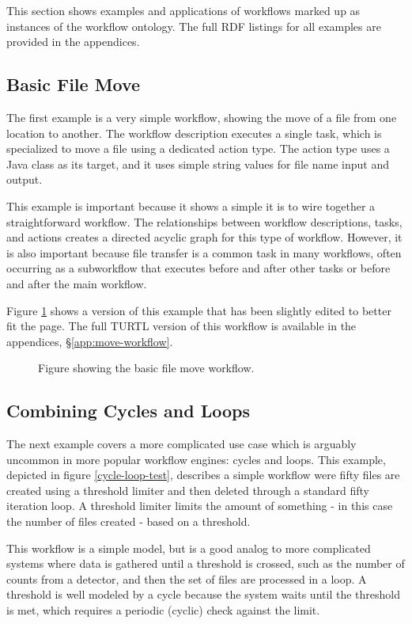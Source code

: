 This section shows examples and applications of workflows marked up as
instances of the workflow ontology. The full RDF listings for all
examples are provided in the appendices.

\subsection{Basic File Move}

The first example is a very simple workflow, showing the move of a file from
one location to another. The workflow description executes a single task, which
is specialized to move a file using a dedicated action type. The action type
uses a Java class as its target, and it uses simple string values for file name
input and output.

This example is important because it shows a simple it is to wire together a
straightforward workflow. The relationships between workflow descriptions,
tasks, and actions creates a directed acyclic graph for this type of workflow.
However, it is also important because file transfer is a common task in many
workflows, often occurring as a subworkflow that executes before and after
other tasks or before and after the main workflow.

Figure \ref{move-workflows} shows a version of this example that has been
slightly edited to better fit the page. The full TURTL version of this workflow
is available in the appendices, \S \ref{app:move-workflow}.

\begin{figure}[htbp]
\centering
{}
\caption{Figure showing the basic file move workflow.}
\label{move-workflows}
\end{figure}

\subsection{Combining Cycles and Loops}

The next example covers a more complicated use case which is arguably uncommon
in more popular workflow engines: cycles and loops. This example, depicted in
figure \ref{cycle-loop-test}, describes a simple workflow were fifty files are
created using a threshold limiter and then deleted through a standard fifty
iteration loop. A threshold limiter limits the amount of something - in this
case the number of files created - based on a threshold. 

This workflow is a simple model, but is a good analog to more complicated
systems where data is gathered until a threshold is crossed, such as the number
of counts from a detector, and then the set of files are processed in a loop. A
threshold is well modeled by a cycle because the system waits until the
threshold is met, which requires a periodic (cyclic) check against the limit.

